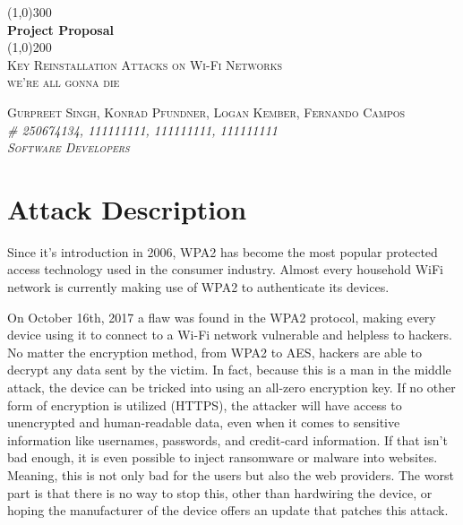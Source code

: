 \documentclass[11pt,]{article}
\begin{document}
\doublespacing

\begin{titlepage}
    \begin{center}
    \line(1,0){300} \\ 
    [0.25in]
    \huge{\bfseries Project Proposal} \\
    [2mm]
    \line(1,0){200} \\
    [1.5cm] 
    \textsc{\Large Key Reinstallation Attacks on Wi-Fi Networks} \\
    [0.75cm]
    \textsc{\Large we're all gonna die} \\
    [10cm]
    \end{center}
    
    \begin{flushright}
    \textsc{\Large{Gurpreet Singh, Konrad Pfundner, Logan Kember, Fernando Campos \\} \normalsize\emph{\# 250674134, 111111111, 111111111, 111111111 \\} \normalsize\emph{Software Developers \\} }
    
    \end{flushright}
    
\end{titlepage}


\newpage

{
\hypersetup{linkcolor=black}
\setcounter{tocdepth}{2}
\tableofcontents
\newpage
}
\section{Attack Description}\label{attack-description}

Since it's introduction in 2006, WPA2 has become the most popular
protected access technology used in the consumer industry. Almost every
household WiFi network is currently making use of WPA2 to authenticate
its devices.

On October 16th, 2017 a flaw was found in the WPA2 protocol, making
every device using it to connect to a Wi-Fi network vulnerable and
helpless to hackers. No matter the encryption method, from WPA2 to AES,
hackers are able to decrypt any data sent by the victim. In fact,
because this is a man in the middle attack, the device can be tricked
into using an all-zero encryption key. If no other form of encryption is
utilized (HTTPS), the attacker will have access to unencrypted and
human-readable data, even when it comes to sensitive information like
usernames, passwords, and credit-card information. If that isn't bad
enough, it is even possible to inject ransomware or malware into
websites. Meaning, this is not only bad for the users but also the web
providers. The worst part is that there is no way to stop this, other
than hardwiring the device, or hoping the manufacturer of the device
offers an update that patches this attack. \citet{KrackAttacks}
\end{document}
